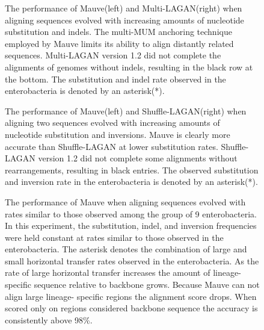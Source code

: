 \documentclass[titlepage,11pt]{article}
\begin{document}
\begin{figure}
\centering
{}
\caption{\label{fig:ntsub_indel_mauve}The performance of Mauve(left) and Multi-LAGAN(right) when aligning
sequences evolved with increasing amounts of nucleotide substitution and indels.
The multi-MUM anchoring technique employed by Mauve limits its ability to align
distantly related sequences.  Multi-LAGAN version 1.2 did not complete
the alignments of genomes without indels, resulting in the black row at the bottom.  The
substitution and indel rate observed in the enterobacteria is denoted by an asterisk(*).
}
\end{figure}


\begin{figure}
\centering
{}
\caption{\label{fig:ntsub_inv_mauve}The performance of Mauve(left) and Shuffle-LAGAN(right) when aligning
two sequences evolved with increasing amounts of nucleotide substitution and
inversions.  Mauve is clearly more accurate than Shuffle-LAGAN at lower
substitution rates.  Shuffle-LAGAN version 1.2 did not complete some alignments
without rearrangements, resulting in black entries.  The observed substitution
and inversion rate in the enterobacteria is denoted by an asterisk(*).
}
\end{figure}

\begin{figure}
\centering {}
\caption{\label{fig:entero_ht}The performance of Mauve when aligning sequences
evolved with rates similar to those observed among the group of 9 enterobacteria. 
In this experiment, the substitution, indel, and inversion frequencies were held 
constant at rates similar to those observed in the enterobacteria.  
The asterisk denotes the combination of large and
small horizontal transfer rates observed in the enterobacteria.  As
the rate of large horizontal transfer increases the amount of lineage-specific
sequence relative to backbone grows. Because Mauve can not align large lineage-
specific regions the alignment score drops.  When scored only on regions
considered backbone sequence the accuracy is consistently above 98\%. }
\end{figure}
\end{document}
